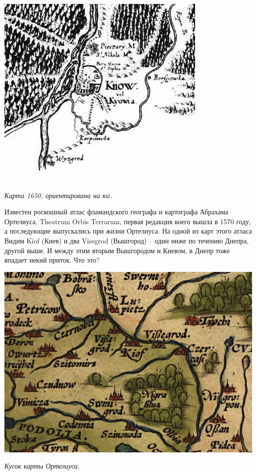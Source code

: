 \begin{center}
\includegraphics[width=\linewidth]{chast-colebanie-osnov/pochayna/1650-repin.jpg}

\textit{Карта 1650, ориентирована на юг.}
\end{center}

Известен роскошный атлас фламандского географа и картографа Абрахама Ортелиуса, Theatrum Orbis Terra\-rum, первая редакция коего вышла в 1570 году, а последующие выпускались при жизни Ортелиуса. На одной из карт этого атласа Видим Kiof (Киев) и два Visegrod (Вышгород) – один ниже по течению Днепра, другой выше. И между этим вторым Вышгородом и Киевом, в Днепр тоже впадает некий приток. Что это?

\begin{center}
\includegraphics[width=\linewidth]{chast-colebanie-osnov/pochayna/1570-map.jpg}

\textit{Кусок карты Ортелиуса.}
\end{center}


